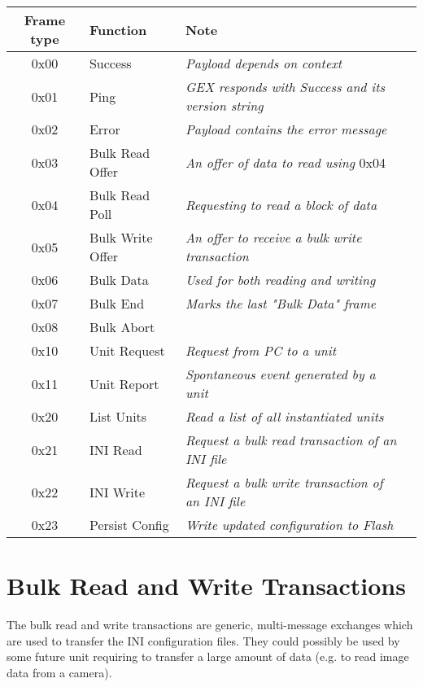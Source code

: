 \begin{table*}[h]
	\centering
	\begin{tabular}{clll}
		\toprule
		\textbf{Frame type} & \textbf{Function} & \textbf{Note} \\
		\midrule
		0x00 & Success & \textit{Payload depends on context} \\
		0x01 & Ping & \textit{GEX responds with Success and its version string} \\
		0x02 & Error & \textit{Payload contains the error message} \\
		\midrule
		0x03 & Bulk Read Offer & \textit{An offer of data to read using }0x04 \\
		0x04 & Bulk Read Poll & \textit{Requesting to read a block of data} \\
		0x05 & Bulk Write Offer & \textit{An offer to receive a bulk write transaction} \\
		0x06 & Bulk Data & \textit{Used for both reading and writing} \\
		0x07 & Bulk End & \textit{Marks the last "Bulk Data" frame} \\
		0x08 & Bulk Abort & \textit{} \\		
		\midrule
		0x10 & Unit Request & \textit{Request from PC to a unit} \\
		0x11 & Unit Report & \textit{Spontaneous event generated by a unit} \\		
		\midrule
		0x20 & List Units & \textit{Read a list of all instantiated units} \\
		0x21 & INI Read & \textit{Request a bulk read transaction of an INI file} \\
		0x22 & INI Write & \textit{Request a bulk write transaction of an INI file} \\
		0x23 & Persist Config & \textit{Write updated configuration to Flash} \\
		\bottomrule
	\end{tabular}
\end{table*}


\section{Bulk Read and Write Transactions}

The bulk read and write transactions are generic, multi-message exchanges which are used to transfer the INI configuration files. They could possibly be used by some future unit requiring to transfer a large amount of data (e.g. to read image data from a camera).

